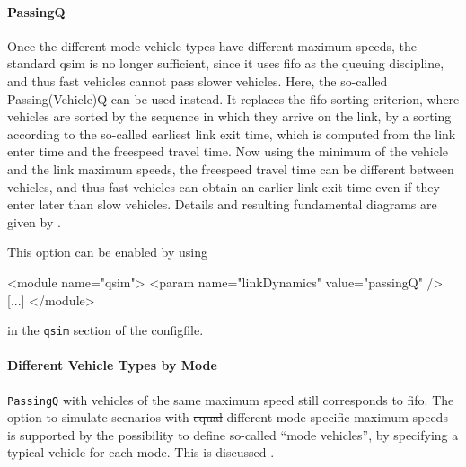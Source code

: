\paragraph{PassingQ} 
Once the different mode vehicle types have different maximum speeds, the standard \gls{qsim} is no longer sufficient, since it uses \acrfull{fifo} as the queuing discipline, and thus fast vehicles cannot pass slower vehicles.  Here, the so-called Passing(Vehicle)Q can be used instead.  It replaces the \gls{fifo} sorting criterion, where vehicles are sorted by the sequence in which they arrive on the link, by a sorting according to the so-called earliest link exit time, which is computed from the link enter time and the freespeed travel time.  Now using the minimum of the vehicle and the link maximum speeds, the freespeed travel time can be different between vehicles, and thus fast vehicles can obtain an earlier link exit time even if they enter later than slow vehicles.  Details and resulting fundamental diagrams are given by \cite{AgarwalEtcMixedTraffic}.

This option can be enabled by using
\begin{xml}
<module name="qsim">
   <param name="linkDynamics" value="passingQ" />
   [...]
</module>
\end{xml}
in the \lstinline{qsim} section of the \gls{configfile}.

\paragraph{Different Vehicle Types by Mode}
\lstinline|PassingQ| with vehicles of the same maximum speed still corresponds to \gls{fifo}. 
The option to simulate scenarios with \st{equal} different  mode-specific maximum speeds is supported by the possibility to define so-called ``mode vehicles'', \ie by specifying a typical vehicle for each mode.
%
This is discussed .
%  
%
%
%

